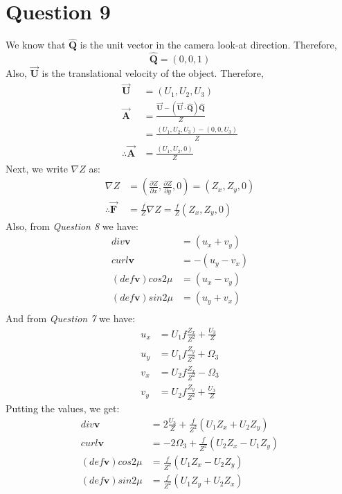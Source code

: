 \documentclass{article}
\newcommand{\boldvec}[1]{\boldsymbol{\vec{\textbf{#1}}}}
\newcommand{\capvec}[1]{\boldsymbol{\hat{\textbf{#1}}}}
\begin{document}
\section*{Question 9}
We know that $\boldsymbol{\hat{\textbf{Q}}}$ is the unit vector in the camera look-at direction. Therefore,
$$ \boldsymbol{\hat{\textbf{Q}}} = (0,0,1)$$
Also, $\boldvec{U}$ is the translational velocity of the object. Therefore,
\begin{align*}
    \boldvec{U} &= (U_1,U_2,U_3)\\
    \boldvec{A} &= \frac{\boldvec{U} - (\boldvec{U} \cdot \capvec{Q})\capvec{Q}}{Z} \\
                &= \frac{(U_1,U_2,U_3) - (0,0,U_3)}{Z} \\
    \therefore \boldvec{A} &= \frac{(U_1,U_2,0)}{Z}
\end{align*}
Next, we write $\nabla Z$ as:
\begin{align*}
\nabla Z &= (\frac{\partial{Z}}{\partial{x}},\frac{\partial{Z}}{\partial{y}},0)
        = (Z_x,Z_y,0) \\
\therefore \boldvec{F}&= \frac{f}{Z}\nabla Z = \frac{f}{Z}(Z_x,Z_y,0)
\end{align*}
Also, from \textit{Question 8} we have:
\begin{align*}
  div\mathbf{v} &= (u_x+v_y) \\
  curl\mathbf{v} &= -(u_y-v_x) \\
  (def\mathbf{v})cos2\mu &= (u_x - v_y) \\ 
  (def\mathbf{v})sin2\mu &= (u_y + v_x) \\ 
\end{align*}
And from \textit{Question 7} we have:
\begin{align*}
u_x &= U_1f\frac{Z_x}{Z^2} + \frac{U_3}{Z}\\
u_y &= U_1f\frac{Z_y}{Z^2} + \Omega_3 \\
v_x &= U_2f\frac{Z_x}{Z^2} - \Omega_3 \\
v_y &= U_2f\frac{Z_y}{Z^2} + \frac{U_3}{Z}
\end{align*}
Putting the values, we get:
\begin{align*}
    div\mathbf{v} &= 2\frac{U_3}{Z} + \frac{f}{Z^2}(U_1Z_x + U_2Z_y)\\
    curl\mathbf{v} &= -2\Omega_3 + \frac{f}{Z^2}(U_2Z_x - U_1Z_y)\\
    (def\mathbf{v})cos2\mu &= \frac{f}{Z^2}(U_1Z_x - U_2Z_y)\\
    (def\mathbf{v})sin2\mu &= \frac{f}{Z^2}(U_1Z_y + U_2Z_x)\\ 
\end{align*}
\end{document}
